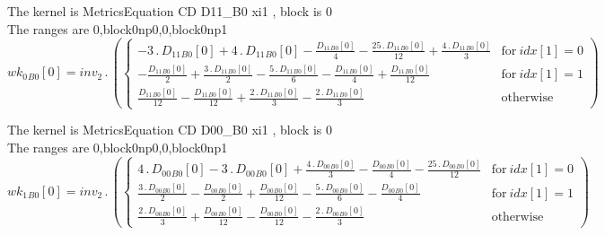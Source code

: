 \documentclass{article}
\begin{document}
\noindent The kernel is MetricsEquation CD D11_B0 xi1 , block is 0\\\noindent The ranges are 0,block0np0,0,block0np1\\\begin{dmath}{wk_{0}{_{B0}}}[{0}] = inv_2 \,.\, \left(\begin{cases} - 3 \,.\, {D_{11}{_{B0}}}[{0}] + 4 \,.\, {D_{11}{_{B0}}}[{0}] - \frac{{D_{11}{_{B0}}}[{0}]}{4} - \frac{25 \,.\, {D_{11}{_{B0}}}[{0}]}{12} + \frac{4 \,.\, {D_{11}{_{B0}}}[{0}]}{3} & 
\text{for}\: {idx}[{1}] = 0 \\- \frac{{D_{11}{_{B0}}}[{0}]}{2} + \frac{3 \,.\, {D_{11}{_{B0}}}[{0}]}{2} - \frac{5 \,.\, {D_{11}{_{B0}}}[{0}]}{6} - \frac{{D_{11}{_{B0}}}[{0}]}{4} + \frac{{D_{11}{_{B0}}}[{0}]}{12} & \text{for}\: {idx}[{1}] = 1 
\\\frac{{D_{11}{_{B0}}}[{0}]}{12} - \frac{{D_{11}{_{B0}}}[{0}]}{12} + \frac{2 \,.\, {D_{11}{_{B0}}}[{0}]}{3} - \frac{2 \,.\, {D_{11}{_{B0}}}[{0}]}{3} & \text{otherwise} \end{cases}\right)\end{dmath}

\noindent The kernel is MetricsEquation CD D00_B0 xi1 , block is 0\\\noindent The ranges are 0,block0np0,0,block0np1\\\begin{dmath}{wk_{1}{_{B0}}}[{0}] = inv_2 \,.\, \left(\begin{cases} 4 \,.\, {D_{00}{_{B0}}}[{0}] - 3 \,.\, {D_{00}{_{B0}}}[{0}] + \frac{4 \,.\, {D_{00}{_{B0}}}[{0}]}{3} - \frac{{D_{00}{_{B0}}}[{0}]}{4} - \frac{25 \,.\, {D_{00}{_{B0}}}[{0}]}{12} & 
\text{for}\: {idx}[{1}] = 0 \\\frac{3 \,.\, {D_{00}{_{B0}}}[{0}]}{2} - \frac{{D_{00}{_{B0}}}[{0}]}{2} + \frac{{D_{00}{_{B0}}}[{0}]}{12} - \frac{5 \,.\, {D_{00}{_{B0}}}[{0}]}{6} - \frac{{D_{00}{_{B0}}}[{0}]}{4} & \text{for}\: {idx}[{1}] = 1 \\\frac{2 
\,.\, {D_{00}{_{B0}}}[{0}]}{3} + \frac{{D_{00}{_{B0}}}[{0}]}{12} - \frac{{D_{00}{_{B0}}}[{0}]}{12} - \frac{2 \,.\, {D_{00}{_{B0}}}[{0}]}{3} & \text{otherwise} \end{cases}\right)\end{dmath}
\end{document}
